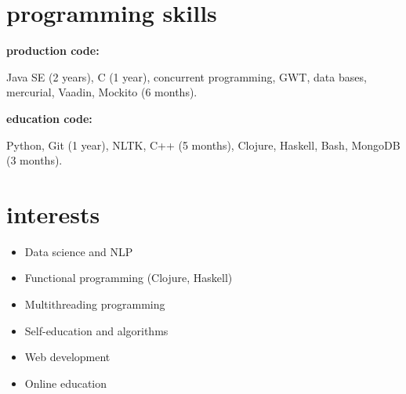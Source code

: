 \documentclass[]{friggeri-cv} %
\begin{document}
%

\section{programming skills}
\textbf{production code:}

Java SE (2 years), C (1 year), concurrent programming, GWT,
data bases, mercurial, Vaadin, Mockito (6 months).

\textbf{education code:}

Python, Git (1 year), NLTK, C++ (5 months), Clojure, Haskell, Bash, MongoDB (3 months).

\section{interests}
\begin{multicols}{2}

\begin{itemize}
  \item Data science and NLP
  \item Functional programming (Clojure, Haskell)
  \item Multithreading programming
  \item Self-education and algorithms
  \item Web development
  \item Online education
\end{itemize}
\end{multicols}
\end{document}
